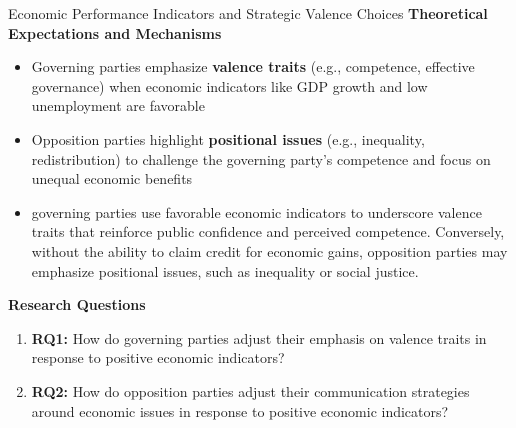 \documentclass[10pt, aspectratio=169]{beamer}
\begin{document}
\begin{frame}{Economic Performance Indicators and Strategic Valence Choices}
    \textbf{Theoretical Expectations and Mechanisms}
    \begin{itemize}
        \item Governing parties emphasize \textbf{valence traits} (e.g., competence, effective governance) when economic indicators like GDP growth and low unemployment are favorable
        \item Opposition parties highlight \textbf{positional issues} (e.g., inequality, redistribution) to challenge the governing party's competence and focus on unequal economic benefits
        \item governing parties use favorable economic indicators to
        underscore valence traits that reinforce public confidence and perceived competence. Conversely, without
        the ability to claim credit for economic gains, opposition parties may emphasize positional issues, such
        as inequality or social justice.
    \end{itemize}
    
    \vspace{0.3cm}
    \textbf{Research Questions}
    \begin{enumerate}
        \item \textbf{RQ1:} How do governing parties adjust their emphasis on valence traits in response to positive economic indicators?
        \item \textbf{RQ2:} How do opposition parties adjust their communication strategies around economic issues in response to positive economic indicators?
    \end{enumerate}
    \end{frame}
\end{document}

